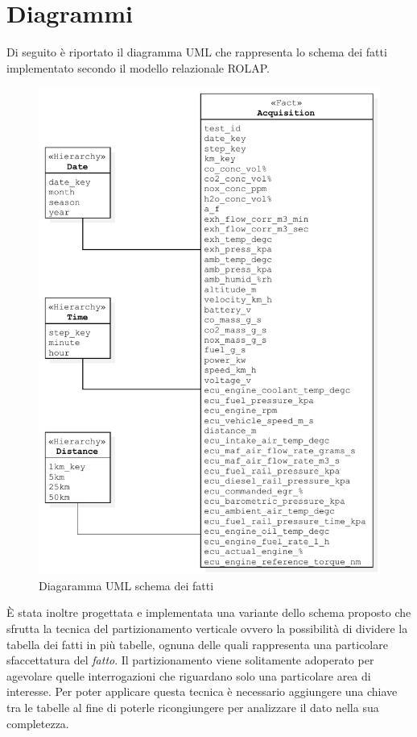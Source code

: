 \section{Diagrammi}
Di seguito è riportato il diagramma UML che rappresenta lo schema dei fatti implementato secondo il modello relazionale ROLAP.
\begin{figure}[H]
	\centering
	\includegraphics[scale=0.56]{figures/class_fact_scheme}
	\caption{Diagaramma UML schema dei fatti}
	\label{fig:ofm}
\end{figure}
È stata inoltre progettata e implementata una variante dello schema proposto che sfrutta la tecnica del partizionamento verticale ovvero la possibilità di dividere la tabella dei fatti in più tabelle, ognuna delle quali rappresenta una particolare sfaccettatura del \textit{fatto}. Il partizionamento viene solitamente adoperato per agevolare quelle interrogazioni che riguardano solo una particolare area di interesse. Per poter applicare questa tecnica è necessario aggiungere una chiave tra le tabelle al fine di poterle ricongiungere per analizzare il dato nella sua completezza.
